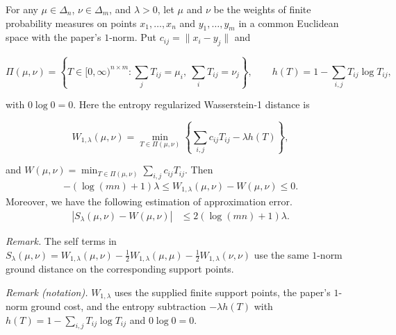 \begin{lemma}\label{lemma:sinkhorn_approx}
For any $\mu\in\Delta_n$, $\nu\in\Delta_m$, and $\lambda>0$, let $\mu$ and $\nu$ be the weights of finite probability measures on points $x_1,\ldots,x_n$ and $y_1,\ldots,y_m$ in a common Euclidean space with the paper's $1$-norm. Put $c_{ij}=\|x_i-y_j\|$ and

\[
\Pi(\mu,\nu)=\left\{T\in[0,\infty)^{n\times m}:\sum_jT_{ij}=\mu_i,\ \sum_iT_{ij}=\nu_j\right\},\qquad h(T)=1-\sum_{i,j}T_{ij}\log T_{ij},
\]

with $0\log0=0$. Here the entropy regularized Wasserstein-1 distance is

\[
W_{1,\lambda}(\mu,\nu)=\min_{T\in\Pi(\mu,\nu)}\left\{\sum_{i,j}c_{ij}T_{ij}-\lambda h(T)\right\},
\]

and $W(\mu,\nu)=\min_{T\in\Pi(\mu,\nu)}\sum_{i,j}c_{ij}T_{ij}$. Then
\begin{align*}
-(\log(mn)+1)\lambda\leqslant W_{1,\lambda}(\mu,\nu)-W(\mu,\nu)\leqslant0.
\end{align*} Moreover, we have the following estimation of approximation error.  
\begin{align*}
|S_{\lambda }( \mu ,\nu ) -W( \mu ,\nu ) | & \leqslant 2(\log( mn) +1) \lambda .
\end{align*}
\end{lemma}

\noindent\textit{Remark.} The self terms in $S_\lambda(\mu,\nu)=W_{1,\lambda}(\mu,\nu)-\tfrac12W_{1,\lambda}(\mu,\mu)-\tfrac12W_{1,\lambda}(\nu,\nu)$ use the same $1$-norm ground distance on the corresponding support points.

\noindent\textit{Remark (notation).} $W_{1,\lambda}$ uses the supplied finite support points, the paper's $1$-norm ground cost, and the entropy subtraction $-\lambda h(T)$ with $h(T)=1-\sum_{i,j}T_{ij}\log T_{ij}$ and $0\log0=0$.

